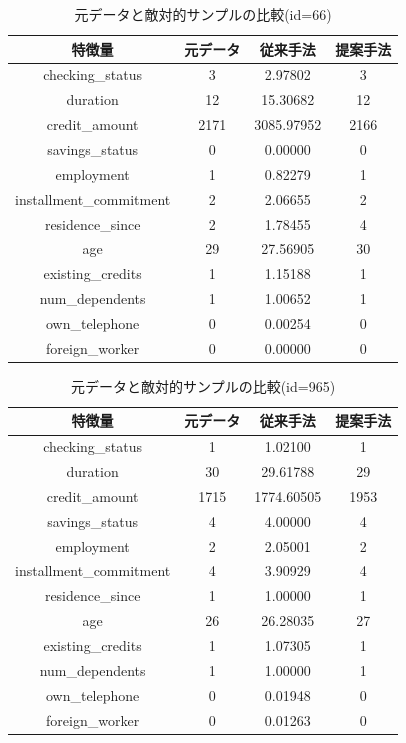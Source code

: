 \begin{table}[H]
    \centering
    \caption{元データと敵対的サンプルの比較(id=66)}
    \begin{tabular}{|c|c|c|c|} \hline
        特徴量 & 元データ & 従来手法 & 提案手法 \\ \hline
        checking\_status & 3 & 2.97802 & 3 \\ \hline
        duration & 12 & 15.30682 & 12 \\ \hline
        credit\_amount & 2171 & 3085.97952 & 2166 \\ \hline
        savings\_status & 0 & 0.00000 & 0 \\ \hline
        employment & 1 & 0.82279 & 1 \\ \hline
        installment\_commitment & 2 & 2.06655 & 2 \\ \hline
        residence\_since & 2 & 1.78455 & 4 \\ \hline
        age & 29 & 27.56905 & 30 \\ \hline
        existing\_credits & 1 & 1.15188 & 1 \\ \hline
        num\_dependents & 1 & 1.00652 & 1 \\ \hline
        own\_telephone & 0 & 0.00254 & 0 \\ \hline
        foreign\_worker & 0 & 0.00000 & 0 \\ \hline
    \end{tabular}
\end{table}

\begin{table}[H]
    \centering
    \caption{元データと敵対的サンプルの比較(id=965)}
    \begin{tabular}{|c|c|c|c|} \hline
        特徴量 & 元データ & 従来手法 & 提案手法 \\ \hline
        checking\_status & 1 & 1.02100 & 1 \\ \hline
        duration & 30 & 29.61788 & 29 \\ \hline
        credit\_amount & 1715 & 1774.60505 & 1953 \\ \hline
        savings\_status & 4 & 4.00000 & 4 \\ \hline
        employment & 2 & 2.05001 & 2 \\ \hline
        installment\_commitment & 4 & 3.90929 & 4 \\ \hline
        residence\_since & 1 & 1.00000 & 1 \\ \hline
        age & 26 & 26.28035 & 27 \\ \hline
        existing\_credits & 1 & 1.07305 & 1 \\ \hline
        num\_dependents & 1 & 1.00000 & 1 \\ \hline
        own\_telephone & 0 & 0.01948 & 0 \\ \hline
        foreign\_worker & 0 & 0.01263 & 0 \\ \hline
    \end{tabular}
\end{table}

